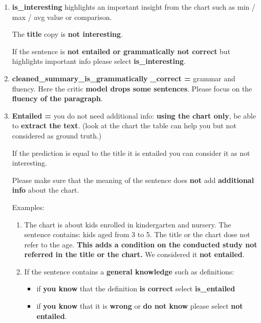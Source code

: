\begin{enumerate}
    \item \textbf{is\_interesting} highlights an important insight from the chart such as min / max / avg value or comparison.
    
    The \textbf{title} copy is \textbf{not interesting}.
    
    If the sentence is \textbf{not entailed or grammatically not correct} but highlights important info please select \textbf{is\_interesting}.
    
    \item \textbf{cleaned\_summary\_is\_grammatically} \textbf{\_correct =} grammar and fluency. Here the critic \textbf{model drops some sentences}. Please focus on the \textbf{fluency of the paragraph}.
    
    \item \textbf{Entailed =} you do not need additional info: \textbf{using the chart only}, be able to \textbf{extract the text}. (look at the chart the table can help you but not considered as ground truth.)
    
    If the prediction is equal to the title it is entailed you can consider it as not interesting.
    
    Please make sure that the meaning of the sentence does \textbf{not} add \textbf{additional info} about the chart.
    
    Examples:
    
    \begin{enumerate}
        \item The chart is about kids enrolled in kindergarten and nursery. The sentence contains: kids aged from 3 to 5. The title or the chart dose not refer to the age. \textbf{This adds a condition on the conducted study not referred in the title or the chart.} We considered it \textbf{not entailed}.\\
    
    
        \item If the sentence contains a \textbf{general knowledge} such as definitions:
        \begin{itemize}
            \item if \textbf{you know} that the definition \textbf{is correct} select \textbf{is\_entailed}
            \item if \textbf{you know} that it is \textbf{wrong} or \textbf{do not know} please select \textbf{not entailed}.
        \end{itemize}
    \end{enumerate}
    

\end{enumerate}
